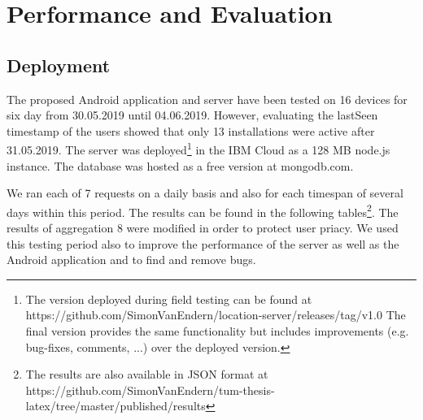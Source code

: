 \chapter{Performance and Evaluation}\label{chapter:performance}
\section{Deployment}
The proposed Android application and server have been tested on 16 devices for six day from 30.05.2019 until 04.06.2019. However, evaluating the lastSeen timestamp of the users showed that only 13 installations were active after 31.05.2019. The server was deployed\footnote{The version deployed during field testing can be found at https://github.com/SimonVanEndern/location-server/releases/tag/v1.0 The final version provides the same functionality but includes improvements (e.g. bug-fixes, comments, ...) over the deployed version.} in the IBM Cloud as a 128 MB node.js instance. The database was hosted as a free version at mongodb.com.

We ran each of 7 requests on a daily basis and also for each timespan of several days within this period. The results can be found in the following tables\footnote{The results are also available in JSON format at https://github.com/SimonVanEndern/tum-thesis-latex/tree/master/published/results}. The results of aggregation 8 were modified in order to protect user priacy. We used this testing period also to improve the performance of the server as well as the Android application and to find and remove bugs.

